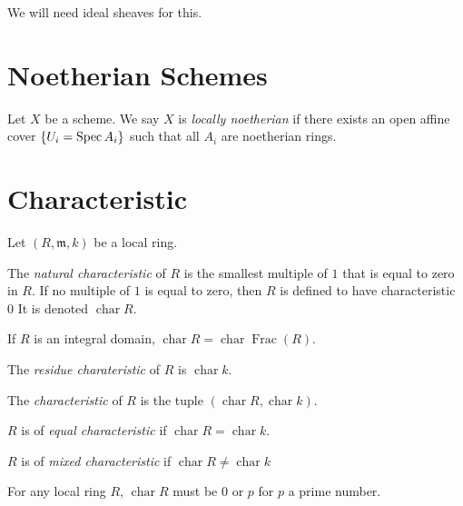 We will need ideal sheaves for this.

\section{Noetherian Schemes}

\begin{defn}
	Let \(X\) be a scheme. 
	We say \(X\) is \textit{locally noetherian}
	if there exists an open affine cover
	\(\{U_{i} = \operatorname{Spec} A_{i}\}\) such that
	all \(A_{i}\) are noetherian rings.
\end{defn}

\section{Characteristic}

\newcommand{\ch}{\operatorname{char}}
\newcommand{\Frac}{\operatorname{Frac}}


Let \((R,\mathfrak{m},k)\) be a local ring.

\begin{defn}
	The \textit{natural characteristic} of \(R\) is
	the smallest multiple of \(1\) that is equal to zero in \(R\).
	If no multiple of \(1\) is equal to zero, then \(R\) is
	defined to have characteristic \(0\)
	It is denoted \(\ch R\).
\end{defn}

\begin{lem}
	If \(R\) is an integral domain, 
	\(\ch R = \ch \Frac(R)\).
\end{lem}

\begin{defn}
	The \textit{residue charateristic} of \(R\) is
	\(\ch k\).
\end{defn}

\begin{defn}
	The \textit{characteristic} of \(R\) is the tuple
	\((\ch R, \ch k)\).
\end{defn}

\begin{defn}
	\(R\) is of \textit{equal characteristic} if
	\(\ch R = \ch k\).
\end{defn}

\begin{defn}
	\(R\) is of \textit{mixed characteristic} if
	\(\ch R \neq \ch k\)
\end{defn}

\begin{lem}
	For any local ring \(R\), \(\ch R\) must be \(0\) or \(p\) 
	for \(p\) a prime number.
\end{lem}

